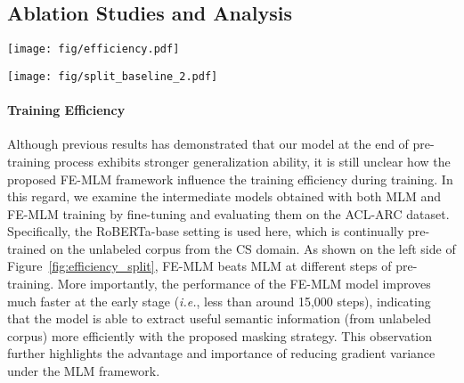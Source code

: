 \documentclass{article} \usepackage{iclr2021_conference,times}
\theoremstyle{plain}
\begin{document}
\vspace{-3mm}
\subsection{Ablation Studies and Analysis}
\vspace{-2mm}
\begin{minipage}{\textwidth}
\begin{minipage}[b]{0.48\linewidth}
	\centering
	\texttt{[image: fig/efficiency.pdf]} 
\vspace{-2mm}
\end{minipage}
\hfill
\begin{minipage}[b]{0.48\linewidth}
	\centering
	\texttt{[image: fig/split\_baseline\_2.pdf]} 
\vspace{-3mm}
\end{minipage}
\vspace{-1mm}
\label{fig:efficiency_split}
\end{minipage}

\vspace{-1mm}
\paragraph{Training Efficiency} Although previous results has demonstrated that our model at the end of pre-training process exhibits stronger generalization ability, it is still unclear how the proposed FE-MLM framework influence the training efficiency during training. In this regard, we examine the intermediate models obtained with both MLM and FE-MLM training by fine-tuning and evaluating them on the ACL-ARC dataset. Specifically, the RoBERTa-base setting is used here, which is continually pre-trained on the unlabeled corpus from the CS domain. As shown on the left side of Figure~\ref{fig:efficiency_split}, FE-MLM beats MLM at different steps of pre-training. More importantly, the performance of the FE-MLM model improves much faster at the early stage (\emph{i.e.}, less than around 15,000 steps), indicating that the model is able to extract useful semantic information (from unlabeled corpus) more efficiently with the proposed masking strategy. This observation further highlights the advantage and importance of reducing gradient variance under the MLM framework.
\vspace{-2mm}
\end{document}
